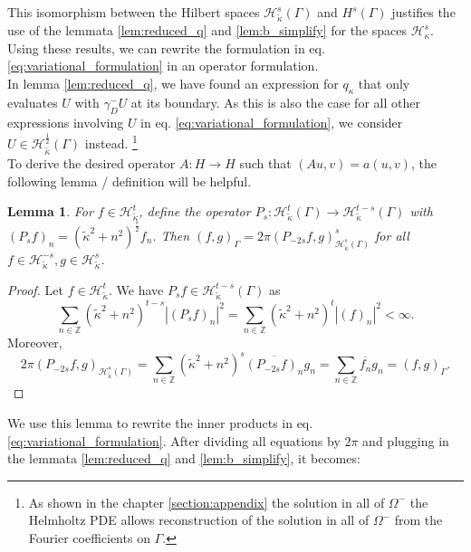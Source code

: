 \documentclass[12pt,journal,compsoc, onecolumn]{IEEEtran}
\newtheorem{lemma}[theorem]{Lemma}
\begin{document}
This isomorphism between the Hilbert spaces $\mathcal{H}_{\tilde \kappa}^{s}(\Gamma)$ and ${H}^{s}(\Gamma)$ justifies the use of the lemmata \ref{lem:reduced_q} and \ref{lem:b_simplify} for the spaces $\mathcal{H}_\kappa^{s}$.
Using these results, we can rewrite the formulation in eq. \ref{eq:variational_formulation} in an operator formulation. \\
In lemma \ref{lem:reduced_q}, we have found an expression for $q_\kappa$   that only evaluates $U$ with  $\gamma_D^-U$ at its boundary. As this is also the case for all other expressions involving $U$ in eq. \ref{eq:variational_formulation}, we consider $ U\in \mathcal{H}_{\tilde \kappa}^{\frac{1}{2}}(\Gamma)$ instead. \footnote{As shown in the chapter \ref{section:appendix} the solution in all of $\Omega^-$ the Helmholtz PDE allows reconstruction of the solution in all of $\Omega^-$ from the Fourier coefficients on $\Gamma$.} \\
To derive the desired operator $A: H \rightarrow H$ such that $(Au, v) = a(u,v)$, the following lemma / definition will be helpful.
\begin{lemma}
    For $f \in \mathcal{H}_{\tilde \kappa}^t$, define the operator $P_s: \mathcal{H}^t_{\tilde \kappa}(\Gamma) \rightarrow \mathcal{H}^{t-s}_{\tilde \kappa}(\Gamma)$ with $(P_sf)_n = ( \tilde\kappa^2 + n^2)^{\frac{s}{2}} f_n$. Then $(f, g)_\Gamma = 2 \pi (P_{-2s}f, g)_{\mathcal{H}_{\tilde\kappa}^s(\Gamma)}^s$ for all $f \in \mathcal{H}_{\tilde \kappa}^{-s}, g \in \mathcal{H}_{\tilde \kappa}^{s}$. 
\end{lemma}
\begin{proof}
Let $f \in \mathcal{H}_{\tilde \kappa}^t$.
We have $P_sf \in \mathcal{H}^{t-s}_{\tilde \kappa}(\Gamma)$ as 
$$
\sum_{n \in \mathbb{Z}}\left(\tilde{\kappa}^{2}+n^{2}\right)^{t-s}\left|(P_sf)_{n}\right|^{2} = \sum_{n \in \mathbb{Z}}\left(\tilde{\kappa}^{2}+n^{2}\right)^{t}\left|(f)_{n}\right|^{2} < \infty.
$$
Moreover, 
$$
2 \pi (P_{-2s}f, g)_{\mathcal{H}_{\tilde\kappa}^s(\Gamma)} = \sum_{n \in \mathbb{Z}}\left(\tilde{\kappa}^{2}+n^{2}\right)^{s}  \overline{(P_{-2s}f)_{n}} {g_n} =
\sum_{n \in \mathbb{Z}} \overline{f_n} {g_n} = (f, g)_\Gamma.
$$
\end{proof}
\noindent We  use this lemma to rewrite the inner products in eq. \ref{eq:variational_formulation}. After dividing all equations by $2\pi$ and plugging in the lemmata \ref{lem:reduced_q} and \ref{lem:b_simplify}, it becomes: 
\end{document}
